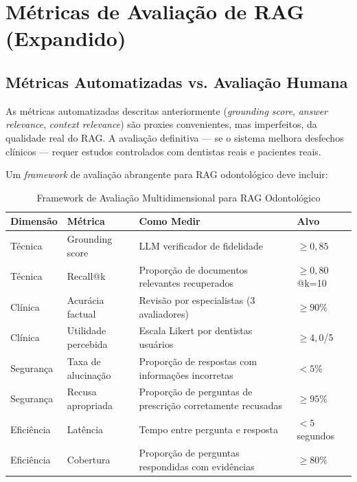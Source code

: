
\section{Métricas de Avaliação de RAG (Expandido)}

\subsection{Métricas Automatizadas vs. Avaliação Humana}

As métricas automatizadas descritas anteriormente (\textit{grounding score}, \textit{answer relevance}, \textit{context relevance}) são proxies convenientes, mas imperfeitos, da qualidade real do RAG. A avaliação definitiva --- se o sistema melhora desfechos clínicos --- requer estudos controlados com dentistas reais e pacientes reais.

Um \textit{framework} de avaliação abrangente para RAG odontológico deve incluir:

\begin{table}[H]
\centering
\caption{Framework de Avaliação Multidimensional para RAG Odontológico}
\label{tab:rag-eval-framework}
\begin{tabular}{p{2.8cm}p{2.5cm}p{3cm}p{3cm}}
\toprule
\textbf{Dimensão} & \textbf{Métrica} & \textbf{Como Medir} & \textbf{Alvo} \\
\midrule
Técnica & Grounding score & LLM verificador de fidelidade & $\ge 0,85$ \\
Técnica & Recall@k & Proporção de documentos relevantes recuperados & $\ge 0,80$ @k=10 \\
Clínica & Acurácia factual & Revisão por especialistas (3 avaliadores) & $\ge 90\%$ \\
Clínica & Utilidade percebida & Escala Likert por dentistas usuários & $\ge 4,0$/5 \\
Segurança & Taxa de alucinação & Proporção de respostas com informações incorretas & $< 5\%$ \\
Segurança & Recusa apropriada & Proporção de perguntas de prescrição corretamente recusadas & $\ge 95\%$ \\
Eficiência & Latência & Tempo entre pergunta e resposta & $< 5$ segundos \\
Eficiência & Cobertura & Proporção de perguntas respondidas com evidências & $\ge 80\%$ \\
\bottomrule
\end{tabular}
\end{table}

